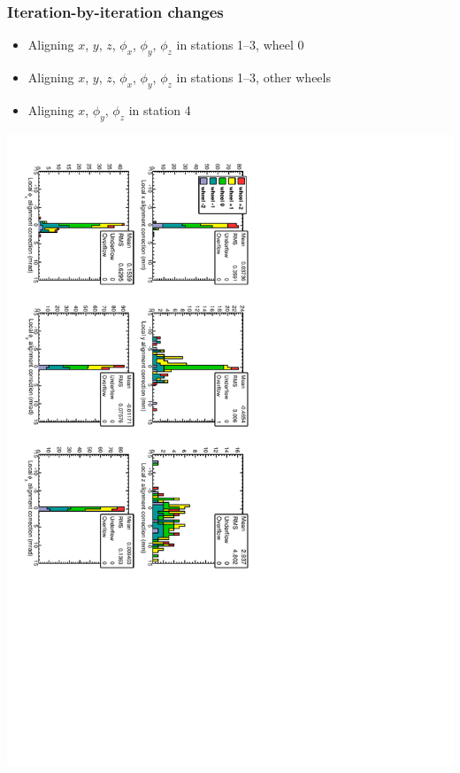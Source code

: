 \documentclass[compress]{beamer}
\begin{document}
\begin{frame}
\frametitle{Iteration-by-iteration changes}

\begin{itemize}
\item Aligning $x$, $y$, $z$, $\phi_x$, $\phi_y$, $\phi_z$ in stations 1--3, wheel 0
\item Aligning $x$, $y$, $z$, $\phi_x$, $\phi_y$, $\phi_z$ in stations 1--3, other wheels
\item Aligning $x$, $\phi_y$, $\phi_z$ in station 4
\end{itemize}

\vfill
\includegraphics[height=\linewidth, angle=90]{data_100GeV_newinternal_iter3.pdf}
\end{frame}
\end{document}
